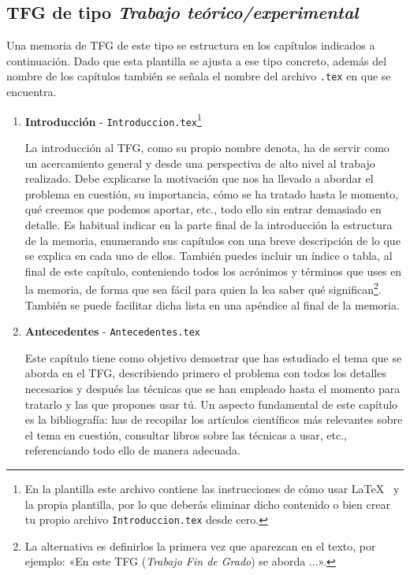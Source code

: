 \subsection{TFG de tipo \textit{Trabajo teórico/experimental}}

Una memoria de TFG de este tipo se estructura en los capítulos indicados a continuación. Dado que esta plantilla se ajusta a ese tipo concreto, además del nombre de los capítulos también se señala el nombre del archivo \texttt{.tex} en que se encuentra.

\begin{enumerate}
    \item \textbf{Introducción} - \texttt{Introduccion.tex}\footnote{En la plantilla este archivo contiene las instrucciones de cómo usar \LaTeX~ y la propia plantilla, por lo que deberás eliminar dicho contenido o bien crear tu propio archivo \texttt{Introduccion.tex} desde cero.} \par
    La introducción al TFG, como su propio nombre denota, ha de servir como un acercamiento general y desde una perspectiva de alto nivel al trabajo realizado. Debe explicarse la motivación que nos ha llevado a abordar el problema en cuestión, su importancia, cómo se ha tratado hasta le momento, qué creemos que podemos aportar, etc., todo ello sin entrar demasiado en detalle. Es habitual indicar en la parte final de la introducción la estructura de la memoria, enumerando sus capítulos con una breve descripción de lo que se explica en cada uno de ellos. También puedes incluir un índice o tabla, al final de este capítulo, conteniendo todos los acrónimos y términos que uses en la memoria, de forma que sea fácil para quien la lea saber qué significan\footnote{La alternativa es definirlos la primera vez que aparezcan en el texto, por ejemplo: «En este TFG (\textit{Trabajo Fin de Grado}) se aborda ...».}. También se puede facilitar dicha lista en una apéndice al final de la memoria.
    
    \item \textbf{Antecedentes} - \texttt{Antecedentes.tex} \par
    Este capítulo tiene como objetivo demostrar que has estudiado el tema que se aborda en el TFG, describiendo primero el problema con todos los detalles necesarios y después las técnicas que se han empleado hasta el momento para tratarlo y las que propones usar tú. Un aspecto fundamental de este capítulo es la bibliografía: has de recopilar los artículos científicos más relevantes sobre el tema en cuestión, consultar libros sobre las técnicas a usar, etc., referenciando todo ello de manera adecuada.
    

\end{enumerate}
